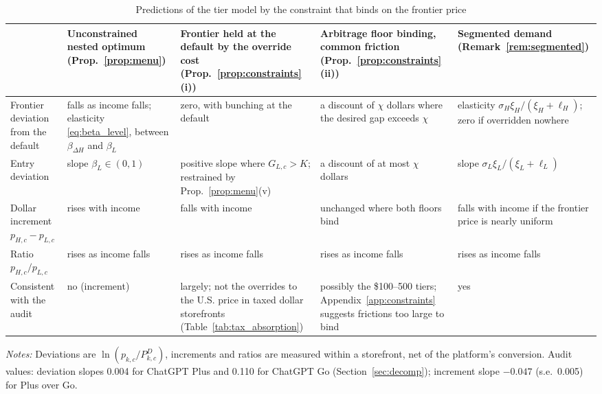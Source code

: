 \documentclass[11pt]{article}
\theoremstyle{definition}
\theoremstyle{remark}
\begin{document}
\begin{table}[t]
\centering
\begin{threeparttable}
\caption{Predictions of the tier model by the constraint that binds on the frontier price}\label{tab:regimes}
\scriptsize
\begin{tabularx}{\textwidth}{@{}>{\raggedright\arraybackslash}p{2.9cm}>{\raggedright\arraybackslash}X>{\raggedright\arraybackslash}X>{\raggedright\arraybackslash}X>{\raggedright\arraybackslash}X@{}}
\toprule
 & Unconstrained nested optimum (Prop.~\ref{prop:menu}) & Frontier held at the default by the override cost (Prop.~\ref{prop:constraints}(i)) & Arbitrage floor binding, common friction (Prop.~\ref{prop:constraints}(ii)) & Segmented demand (Remark~\ref{rem:segmented}) \\
\midrule
Frontier deviation from the default & falls as income falls; elasticity \eqref{eq:beta_level}, between $\beta_{\Delta H}$ and $\beta_L$ & zero, with bunching at the default & a discount of $\chi$ dollars where the desired gap exceeds $\chi$ & elasticity $\sigma_H\xi_H/(\xi_H+\ell_H)$; zero if overridden nowhere \\
Entry deviation & slope $\beta_L\in(0,1)$ & positive slope where $G_{L,c}>K$; restrained by Prop.~\ref{prop:menu}(v) & a discount of at most $\chi$ dollars & slope $\sigma_L\xi_L/(\xi_L+\ell_L)$ \\
Dollar increment $p_{H,c}-p_{L,c}$ & rises with income & falls with income & unchanged where both floors bind & falls with income if the frontier price is nearly uniform \\
Ratio $p_{H,c}/p_{L,c}$ & rises as income falls & rises as income falls & rises as income falls & rises as income falls \\
Consistent with the audit & no (increment) & largely; not the overrides to the U.S. price in taxed dollar storefronts (Table~\ref{tab:tax_absorption}) & possibly the \$100--500 tiers; Appendix~\ref{app:constraints} suggests frictions too large to bind & yes \\
\bottomrule
\end{tabularx}
\begin{tablenotes}[flushleft]\footnotesize
\item \emph{Notes:} Deviations are $\ln(p_{k,c}/P^D_{k,c})$, increments and ratios are measured within a storefront, net of the platform's conversion. Audit values: deviation slopes 0.004 for ChatGPT Plus and 0.110 for ChatGPT Go (Section~\ref{sec:decomp}); increment slope $-0.047$ (s.e.\ 0.005) for Plus over Go.
\end{tablenotes}
\end{threeparttable}
\end{table}
\end{document}
